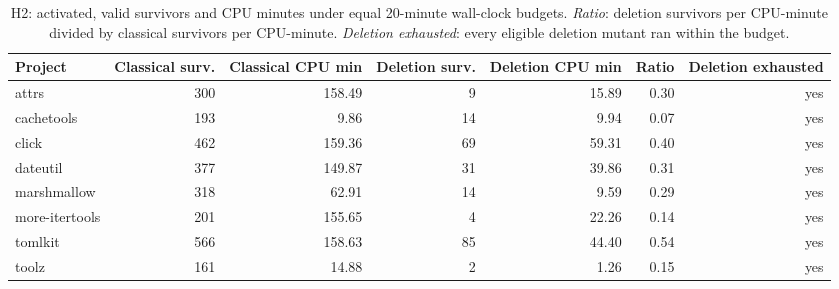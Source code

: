 \begin{table}[t]
\centering\small
\begin{tabular}{lrrrrrr}
\toprule
Project & Classical surv. & Classical CPU min & Deletion surv. & Deletion CPU min & Ratio & Deletion exhausted \\
\midrule
attrs & 300 & 158.49 & 9 & 15.89 & 0.30 & yes \\
cachetools & 193 & 9.86 & 14 & 9.94 & 0.07 & yes \\
click & 462 & 159.36 & 69 & 59.31 & 0.40 & yes \\
dateutil & 377 & 149.87 & 31 & 39.86 & 0.31 & yes \\
marshmallow & 318 & 62.91 & 14 & 9.59 & 0.29 & yes \\
more-itertools & 201 & 155.65 & 4 & 22.26 & 0.14 & yes \\
tomlkit & 566 & 158.63 & 85 & 44.40 & 0.54 & yes \\
toolz & 161 & 14.88 & 2 & 1.26 & 0.15 & yes \\
\bottomrule
\end{tabular}
\caption{H2: activated, valid survivors and CPU minutes under equal 20-minute wall-clock budgets. \emph{Ratio}: deletion survivors per CPU-minute divided by classical survivors per CPU-minute. \emph{Deletion exhausted}: every eligible deletion mutant ran within the budget.}
\label{tab:h2}
\end{table}
